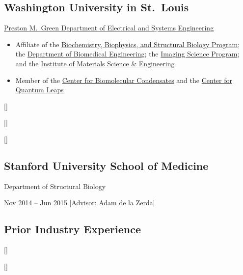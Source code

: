 \documentclass[11pt]{article}
\begin{document}
\subsection*[Washington University]{Washington University in St.\ Louis}
\href{https://ese.washu.edu}{Preston M.\ Green Department of Electrical and Systems Engineering}
\begin{itemize}[nosep,itemsep=\tablerowskip,leftmargin=1em,label=--]
  \item Affiliate of the \href{https://dbbs.wustl.edu/programs/biochemistry-biophysics-structural-biology/}{Biochemistry, Biophysics, and Structural Biology Program}; 
  the \href{https://bme.washu.edu}{Department of Biomedical Engineering}; 
  the \href{https://engineering.washu.edu/academics/programs/imaging-science/index.html}{Imaging Science Program}; 
  and the \href{https://imse.washu.edu}{Institute of Materials Science \& Engineering}
  \item Member of the \href{https://condensates.wustl.edu}{Center for Biomolecular Condensates} and the \href{https://quantumleaps.wustl.edu/}{Center for Quantum Leaps}
\end{itemize} 

[]

[]

[]

\subsection*[Stanford Medicine]{Stanford University School of Medicine}
Department of Structural Biology

{Nov 2014 -- Jun 2015}
[Advisor: \href{https://med.stanford.edu/delazerda.html}{Adam de la Zerda}]

\subsection*{Prior Industry Experience}
[]

[]
  

\end{document}
